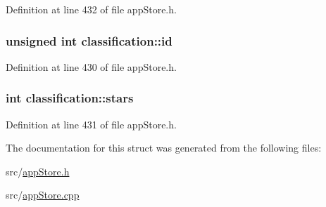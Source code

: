Definition at line 432 of file app\-Store.\-h.

\hypertarget{structclassification_ae462b5f31b8cd7db4f3dc33e6108281e}{
\subsubsection[{id}]{\setlength{\rightskip}{0pt plus 5cm}unsigned int classification\-::id}}\label{structclassification_ae462b5f31b8cd7db4f3dc33e6108281e}


Definition at line 430 of file app\-Store.\-h.

\hypertarget{structclassification_aa4513b5df07d85abafaf2e4ad1ea05a3}{
\subsubsection[{stars}]{\setlength{\rightskip}{0pt plus 5cm}int classification\-::stars}}\label{structclassification_aa4513b5df07d85abafaf2e4ad1ea05a3}


Definition at line 431 of file app\-Store.\-h.



The documentation for this struct was generated from the following files\-:\begin{DoxyCompactItemize}
\item 
src/\hyperlink{app_store_8h}{app\-Store.\-h}\item 
src/\hyperlink{app_store_8cpp}{app\-Store.\-cpp}\end{DoxyCompactItemize}
